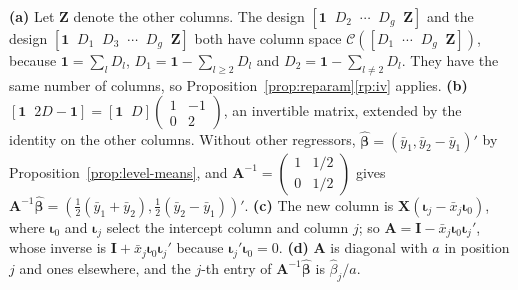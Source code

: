 \documentclass[12pt,a4paper]{article}
\makeatletter
\theoremstyle{definition}
\renewenvironment{proof}[1][\proofname]{\par
  \pushQED{\qed}%
  \normalfont \topsep6\p@\@plus6\p@\relax
  \trivlist
  \item[\hskip\labelsep\bfseries #1\@addpunct{.}]\ignorespaces
}{%
  \popQED\endtrivlist\@endpefalse
}
\newcommand{\bX}{\mathbf{X}}
\def\bb{\boldsymbol{\beta}}
\newcommand{\bI}{\mathbf{I}}
\newcommand{\bone}{\mathbf{1}}
\newcommand{\bA}{\mathbf{A}}
\newcommand{\calC}{\mathcal{C}}
\makeatother
\begin{document}
\begin{proof}
\textbf{(a)} Let $\mathbf{Z}$ denote the other columns. The design $[\bone \;\; D_2 \;\; \cdots \;\; D_g \;\; \mathbf{Z}]$ and the design $[\bone \;\; D_1 \;\; D_3 \;\; \cdots \;\; D_g \;\; \mathbf{Z}]$ both have column space $\calC([D_1 \;\; \cdots \;\; D_g \;\; \mathbf{Z}])$, because $\bone = \sum_lD_l$, $D_1 = \bone - \sum_{l \geqslant 2}D_l$ and $D_2 = \bone - \sum_{l \neq 2}D_l$. They have the same number of columns, so Proposition~\ref{prop:reparam}\ref{rp:iv} applies. \textbf{(b)} $[\bone \;\; 2D - \bone] = [\bone \;\; D]\begin{pmatrix} 1 & -1\\ 0 & 2\end{pmatrix}$, an invertible matrix, extended by the identity on the other columns. Without other regressors, $\hat{\bb} = (\bar y_1, \bar y_2 - \bar y_1)'$ by Proposition~\ref{prop:level-means}, and $\bA^{-1} = \begin{pmatrix} 1 & 1/2\\ 0 & 1/2\end{pmatrix}$ gives $\bA^{-1}\hat{\bb} = (\frac{1}{2}(\bar y_1 + \bar y_2), \frac{1}{2}(\bar y_2 - \bar y_1))'$. \textbf{(c)} The new column is $\bX(\boldsymbol\iota_j - \bar x_j\boldsymbol\iota_0)$, where $\boldsymbol\iota_0$ and $\boldsymbol\iota_j$ select the intercept column and column $j$; so $\bA = \bI - \bar x_j\boldsymbol\iota_0\boldsymbol\iota_j'$, whose inverse is $\bI + \bar x_j\boldsymbol\iota_0\boldsymbol\iota_j'$ because $\boldsymbol\iota_j'\boldsymbol\iota_0 = 0$. \textbf{(d)} $\bA$ is diagonal with $a$ in position $j$ and ones elsewhere, and the $j$-th entry of $\bA^{-1}\hat{\bb}$ is $\hat\beta_j/a$.


\end{proof}
\end{document}
